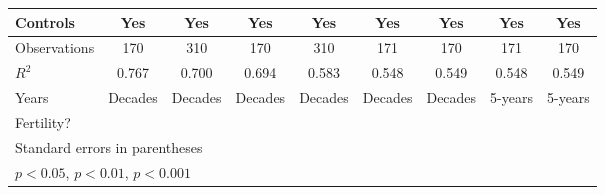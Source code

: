 \begin{table}[htbp]
\begin{tabular}{l*{8}{c}}
\addlinespace
Controls        &      Yes         &      Yes         &      Yes         &      Yes         &      Yes         &      Yes         &      Yes         &      Yes         \\
\midrule
Observations    &      170         &      310         &      170         &      310         &      171         &      170         &      171         &      170         \\
\(R^{2}\)       &    0.767         &    0.700         &    0.694         &    0.583         &    0.548         &    0.549         &    0.548         &    0.549         \\
Years           &  Decades         &  Decades         &  Decades         &  Decades         &  Decades         &  Decades         &  5-years         &  5-years         \\
Fertility?      &                  &                  &                  &                  &                  &                  &                  &                  \\
\bottomrule
\multicolumn{9}{l}{\footnotesize Standard errors in parentheses}\\
\multicolumn{9}{l}{\footnotesize \sym{*} \(p<0.05\), \sym{**} \(p<0.01\), \sym{***} \(p<0.001\)}\\
\end{tabular}
\end{table}
